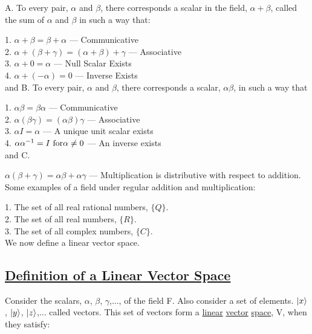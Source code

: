 A. To every pair, $\alpha$ and $\beta$, there corresponds a scalar in the field, $\alpha + \beta$, called the sum of $\alpha$ and $\beta$ in such a way that:

1. $\alpha + \beta = \beta + \alpha$ \quad\quad 		--- Communicative\\
2. $\alpha + (\beta + \gamma) = (\alpha + \beta) + \gamma $ 	--- Associative\\
3. $\alpha + 0 = \alpha $					--- Null Scalar Exists\\
4. $\alpha + (-\alpha) = 0$					--- Inverse Exists\\

and B. To every pair, $\alpha$ and $\beta$, there corresponds a scalar, $\alpha\beta$, in such a way that 

1. $\alpha\beta = \beta\alpha$					--- Communicative\\
2. $\alpha(\beta\gamma) = (\alpha\beta)\gamma$			--- Associative\\
3. $\alpha I = \alpha$ 						--- A unique unit scalar exists\\
4. $\alpha \alpha^{-1} = I \rm ~ for \alpha \ne 0$		--- An inverse exists\\

and C. 

$\alpha(\beta + \gamma) = \alpha\beta + \alpha\gamma$		--- Multiplication is distributive with respect to 
addition.\\

Some examples of a field under regular addition and multiplication:

1. The set of all real rational numbers, $\{Q\}$.\\
2. The set of all real numbers, $\{R\}$. \\
3. The set of all complex numbers, $\{C\}$. \\

We now define a linear vector space.\\

\subsection{\underline{Definition of a Linear Vector Space}}

Consider the scalars, $\alpha$, $\beta$, $\gamma$,..., of the field F. Also consider a set of elements. $|x\rangle$, $
|y\rangle$, $|z\rangle$,... called vectors. This set of vectors form a \underline{linear} \underline{vector} \underline{space},
V, when they satisfy: \\

